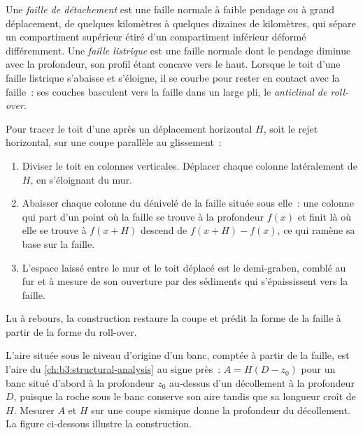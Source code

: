 \begin{definition}\label{def:b3:extension-strike-slip:detachment}
Une \emph{faille de détachement} est une faille normale à faible
pendage ou  à grand déplacement, de quelques kilomètres à quelques dizaines de kilomètres, qui
sépare un compartiment supérieur étiré d'un compartiment inférieur déformé différemment. Une
\emph{faille listrique} est une faille normale dont le pendage
diminue avec la profondeur, son profil étant concave vers le haut. Lorsque le toit d'une
faille listrique s'abaisse et s'éloigne, il se courbe pour rester en contact avec la
faille~: ses couches basculent vers la faille dans un large pli, le \emph{anticlinal de
roll-over}.
\end{definition}

\begin{method}\label{met:b3:extension-strike-slip:heave}
Pour tracer le toit d'une  après un déplacement horizontal
$H$, soit le rejet horizontal, sur une coupe parallèle au glissement~:
\begin{enumerate}
  \item Diviser le toit en colonnes verticales. Déplacer chaque colonne
        latéralement de $H$, en s'éloignant du mur.
  \item Abaisser chaque colonne du dénivelé de la faille située sous elle~: une colonne qui
        part d'un point où la faille se trouve à la profondeur $f(x)$ et finit là où elle
        se trouve à $f(x + H)$ descend de $f(x + H) - f(x)$, ce qui ramène sa base
        sur la faille.
  \item L'espace laissé entre le mur et le toit déplacé est le
        demi-graben, comblé au fur et à mesure de son ouverture par des sédiments qui s'épaississent vers la
        faille.
\end{enumerate}
Lu à rebours, la construction restaure la coupe et prédit la forme
de la faille à partir de la forme du roll-over.
\end{method}

L'aire située sous le niveau d'origine d'un banc, comptée à partir de la faille, est
l'aire du \cref{ch:b3:structural-analysis} au signe près~: $A =
H(D - z_0)$ pour un banc situé d'abord à la profondeur $z_0$ au-dessus d'un décollement à la
profondeur $D$, puisque la roche sous le banc conserve son aire tandis que sa longueur croît de
$H$. Mesurer $A$ et $H$ sur une coupe sismique donne la profondeur du
décollement. La figure ci-dessous illustre la construction.

